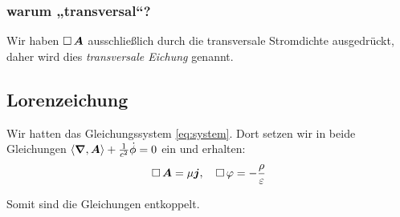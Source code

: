 \subsubsection{warum „transversal“?}

Wir haben $\operatorname{\Box} \boldsymbol{A}$ ausschließlich durch die transversale Stromdichte
ausgedrückt, daher wird dies \emph{transversale Eichung} genannt.

\subsection{Lorenzeichung}

Wir hatten das Gleichungssystem \eqref{eq:system}. Dort setzen wir in beide
Gleichungen $\left\langle \boldsymbol{\nabla}, \boldsymbol{A} \right\rangle + \frac{1}{c^2} \dot \phi = 0$ ein und
erhalten:
\[
	\operatorname{\Box} \boldsymbol{A} = \mu \boldsymbol{j}
	,\quad
	\operatorname{\Box} \varphi = - \frac \rho \varepsilon
\]

Somit sind die Gleichungen entkoppelt.

%
%



